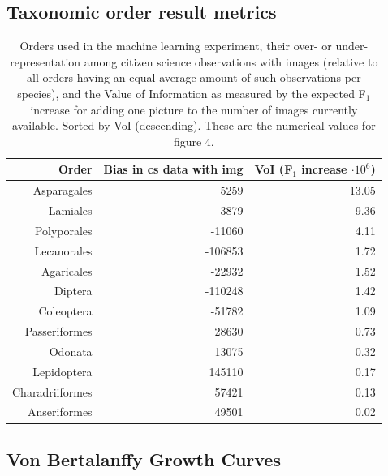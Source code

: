 \documentclass{article}
\begin{document}
\pagebreak
\subsection*{Taxonomic order result metrics}


\begin{table}[h!]
  \centering

  \begin{tabular}{|r | r | r|}
   \hline
   \textbf{Order} & \textbf{Bias in cs data with img} & \textbf{VoI (F\boldmath$_1$ increase \boldmath$\cdot10^{6}$)} \\ [0.5ex]
   \hline
   Asparagales & 5259 & 13.05 \\
   Lamiales & 3879 & 9.36 \\
   Polyporales & -11060 & 4.11 \\
   Lecanorales & -106853 & 1.72 \\
   Agaricales & -22932 & 1.52 \\
   Diptera & -110248 & 1.42 \\
   Coleoptera & -51782 & 1.09 \\
   Passeriformes & 28630 & 0.73 \\
   Odonata & 13075 & 0.32 \\
   Lepidoptera & 145110 & 0.17 \\
   Charadriiformes & 57421 & 0.13 \\
   Anseriformes & 49501 & 0.02 \\  [1ex]
   \hline
  \end{tabular}
  \caption{\footnotesize Orders used in the machine learning experiment, their over- or under-representation among citizen science observations with images (relative to all orders having an equal average amount of such observations per species), and the Value of Information as measured by the expected F\(_1\) increase for adding one picture to the number of images currently available. Sorted by VoI (descending). These are the numerical values for figure 4.}
  \label{tab:biases}
  \end{table}

  \pagebreak
  \subsection*{Von Bertalanffy Growth Curves}
\end{document}
